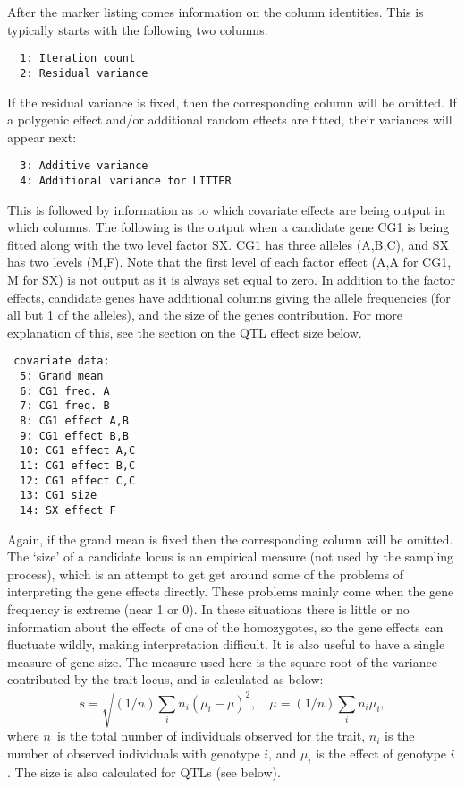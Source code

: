 \documentclass[10pt,a4paper]{article}
\begin{document}
After the marker listing comes information on the column identities.  This
is typically starts with the following two columns:
\begin{verbatim}
  1: Iteration count
  2: Residual variance
\end{verbatim}
If the residual variance is fixed, then the corresponding column will be
omitted.  If a polygenic effect
and/or additional random effects are fitted, their variances will appear next:
\begin{verbatim}
  3: Additive variance
  4: Additional variance for LITTER
\end{verbatim}
This is followed by information as to which covariate effects are
being output in which columns. The following is the output when a candidate
gene CG1 is being fitted along with the two level factor SX.  CG1 has three
alleles (A,B,C), and SX has two levels (M,F). Note that the first level of
each factor effect (A,A for CG1, M for SX) is not output as it is always set
equal to zero. In addition to the factor effects, candidate genes have
additional columns giving the allele frequencies (for all but 1 of the
alleles), and the size of the genes contribution.  For more explanation of
this, see the section on the QTL effect size below.
\begin{verbatim}
 covariate data:
  5: Grand mean
  6: CG1 freq. A
  7: CG1 freq. B
  8: CG1 effect A,B
  9: CG1 effect B,B
  10: CG1 effect A,C
  11: CG1 effect B,C
  12: CG1 effect C,C
  13: CG1 size
  14: SX effect F
\end{verbatim}
Again, if the grand mean is fixed then the corresponding column will be
omitted.  The `size' of a candidate locus is an empirical measure (not used by the sampling
process), which is an attempt to get get around some of the problems of
interpreting the gene effects directly.  These problems mainly come when the
gene frequency is extreme (near 1 or 0).  In these situations there is
little or no information about the effects of one of the homozygotes, so the
gene effects can fluctuate wildly, making interpretation difficult.  It is
also useful to have a single measure of gene size.  The measure used here is
the square root of the variance contributed by the trait locus, and is
calculated as below:
\begin{equation*}
s=\sqrt{(1/n)\sum_in_i(\mu_i-\mu)^2},\quad\mu=(1/n)\sum_in_i\mu_i,
\end{equation*}
where $n$\ is the total number of individuals observed for the trait, $n_i$
is the number of observed individuals with genotype $i$, and $\mu_i$ is the
effect of genotype $i$. The size is also calculated for QTLs (see below).
\end{document}
